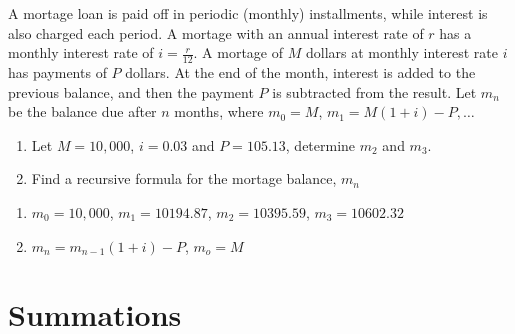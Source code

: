 \begin{questions}
 A mortage loan is paid off in periodic (monthly) installments, while interest is also charged each period.  A mortage with an annual interest rate of $r$ has a monthly interest rate of $i = \frac{r}{12}$.  A mortage of $M$ dollars at monthly interest rate $i$ has payments of $P$ dollars.  At the end of the month, interest is added to the previous balance, and then the payment $P$ is subtracted from the result.  Let $m_n$ be the balance due after $n$ months, where $m_0 = M$, $m_1 = M(1+i) - P, \ldots$
\begin{enumerate}[label=(\alph*),itemsep=0pt,parsep=0pt,
    topsep=0pt,partopsep=0pt]
    \item Let $M = 10,000$, $i = 0.03$ and $P = 105.13$, determine $m_2$ and $m_3$.
    \item Find a recursive formula for the mortage balance, $m_n$
\end{enumerate}
    \ifprintanswers
        \vspace{-10pt}
   \fi
\begin{solution}
    \begin{enumerate}[label=(\alph*),itemsep=0pt,parsep=0pt,
    topsep=0pt,partopsep=0pt]
        \item $m_0 = 10,000$, $m_1 = 10194.87$, $m_2 = 10395.59$, $m_3 =  10602.32$
        \item $m_n = m_{n-1}(1+i) - P$, $m_o = M$
    \end{enumerate}
\end{solution}


\section*{Summations}



\end{questions}
